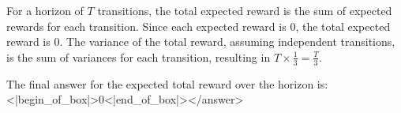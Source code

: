 For a horizon of \( T \) transitions, the total expected reward is the sum of expected rewards for each transition. Since each expected reward is \( 0 \), the total expected reward is \( 0 \). The variance of the total reward, assuming independent transitions, is the sum of variances for each transition, resulting in \( T \times \frac{1}{3} = \frac{T}{3} \).

The final answer for the expected total reward over the horizon is:  
<|begin_of_box|>0<|end_of_box|></answer>